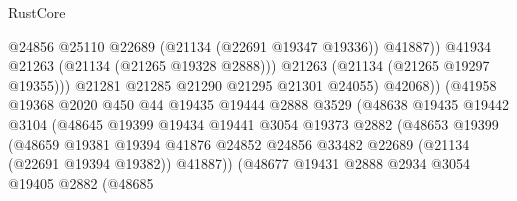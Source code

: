 \begin{lexlean}{RustCore}
\begin{coremodule}
                                            @24856
                                            @25110
                                            @22689
                                            (@21134 (@22691 @19347 @19336))
                                            @41887))
                                        @41934
                                        @21263
                                        (@21134 (@21265 @19328 @2888)))
                                      @21263
                                      (@21134 (@21265 @19297 @19355)))
                                    @21281
                                    @21285
                                    @21290
                                    @21295
                                    @21301
                                    @24055)
                                  @42068))
                              (@41958
                                @19368
                                @2020
                                @450
                                @44
                                @19435
                                @19444
                                @2888
                                @3529
                                (@48638
                                  @19435
                                  @19442
                                  @3104
                                  (@48645
                                    @19399
                                    @19434
                                    @19441
                                    @3054
                                    @19373
                                    @2882
                                    (@48653
                                      @19399
                                      (@48659
                                        @19381
                                        @19394
                                        @41876
                                        @24852
                                        @24856
                                        @33482
                                        @22689
                                        (@21134 (@22691 @19394 @19382))
                                        @41887))
                                    (@48677
                                      @19431
                                      @2888
                                      @2934
                                      @3054
                                      @19405
                                      @2882
                                      (@48685

\end{coremodule}
\end{lexlean}
